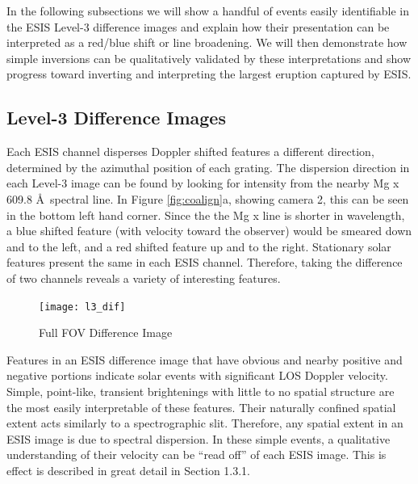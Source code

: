 	In the following subsections we will show a handful of events easily identifiable in the ESIS Level-3 difference images and explain how their presentation can be interpreted as a red/blue shift or line broadening.  
	We will then demonstrate how simple inversions can be qualitatively validated by these interpretations and show progress toward inverting and interpreting the largest eruption captured by ESIS.
	
    \subsection{Level-3 Difference Images}
    
    	Each ESIS channel disperses Doppler shifted features a different direction, determined by the azimuthal position of each grating.
    	The dispersion direction in each Level-3 image can be found by looking for intensity from the nearby Mg {\sc x} 609.8 \AA \ spectral line.
    	In Figure \ref{fig:coalign}a, showing camera 2, this can be seen in the bottom left hand corner.  
   		Since the the Mg {\sc x} line is shorter in wavelength, a blue shifted feature (with velocity toward the observer) would be smeared down and to the left, and a red shifted feature up and to the right.	
   		Stationary solar features present the same in each ESIS channel.
   		Therefore, taking the difference of two channels reveals a variety of interesting features.
   		
   		\begin{figure}[htb!]
   			\centering
   			 		\texttt{[image: l3\_dif]}
   			\caption{Full FOV Difference Image}
   			\label{fig:l3_dif}
   		\end{figure}

    	Features in an ESIS difference image that have obvious and nearby positive and negative portions indicate solar events with significant LOS Doppler velocity.
    	Simple, point-like, transient brightenings with little to no spatial structure are the most easily interpretable of these features.
    	Their naturally confined spatial extent acts similarly to a spectrographic slit.
    	Therefore, any spatial extent in an ESIS image is due to spectral dispersion.
    	In these simple events, a qualitative understanding of their velocity can be ``read off'' of each ESIS image.
    	This is effect is described in great detail in \citet{Rust2019} Section 1.3.1. 
    	
